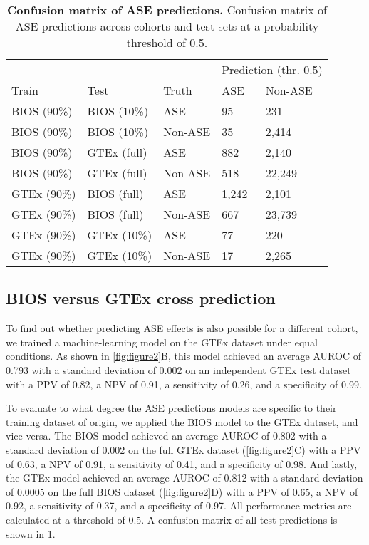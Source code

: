 \documentclass{book}
\begin{document}
\begin{refsection}
\begin{table}[!htb]
  \centering
  \begin{tabular}{lllll}
    ~           & ~           & ~       & \multicolumn{2}{c}{Prediction (thr. 0.5)}	\\
    \cline{4-5}
    Train       & Test        & Truth   & ASE   & Non-ASE \\
    \hline
    BIOS (90\%) & BIOS (10\%) & ASE     & 95    & 231 \\
    BIOS (90\%) & BIOS (10\%) & Non-ASE & 35    & 2,414 \\
    BIOS (90\%) & GTEx (full) & ASE     & 882   & 2,140 \\
    BIOS (90\%) & GTEx (full) & Non-ASE & 518   & 22,249 \\
    GTEx (90\%) & BIOS (full) & ASE     & 1,242 & 2,101 \\
    GTEx (90\%) & BIOS (full) & Non-ASE & 667   & 23,739 \\
    GTEx (90\%) & GTEx (10\%) & ASE     & 77    & 220 \\
    GTEx (90\%) & GTEx (10\%) & Non-ASE & 17    & 2,265 \\
    \hline
  \end{tabular}
  \caption{
  \label{tab:table1} \textbf{Confusion matrix of ASE predictions.}
  Confusion matrix of ASE predictions across cohorts and test sets at a probability threshold of 0.5.}
\end{table}

\subsection*{BIOS versus GTEx cross prediction}
To find out whether predicting ASE effects is also possible for a different cohort, we trained a machine-learning model on the GTEx dataset under equal conditions.
As shown in \ref{fig:figure2}B, this model achieved an average AUROC of 0.793 with a standard deviation of 0.002 on an independent GTEx test dataset with a PPV of 0.82, a NPV of 0.91, a sensitivity of 0.26, and a specificity of 0.99.

To evaluate to what degree the ASE predictions models are specific to their training dataset of origin, we applied the BIOS model to the GTEx dataset, and vice versa.
The BIOS model achieved an average AUROC of 0.802 with a standard deviation of 0.002 on the full GTEx dataset (\ref{fig:figure2}C) with a PPV of 0.63, a NPV of 0.91, a sensitivity of 0.41, and a specificity of 0.98.
And lastly, the GTEx model achieved an average AUROC of 0.812 with a standard deviation of 0.0005 on the full BIOS dataset (\ref{fig:figure2}D) with a PPV of 0.65, a NPV of 0.92, a sensitivity of 0.37, and a specificity of 0.97.
All performance metrics are calculated at a threshold of 0.5.
A confusion matrix of all test predictions is shown in \ref{tab:table1}.


\end{refsection}
\end{document}
